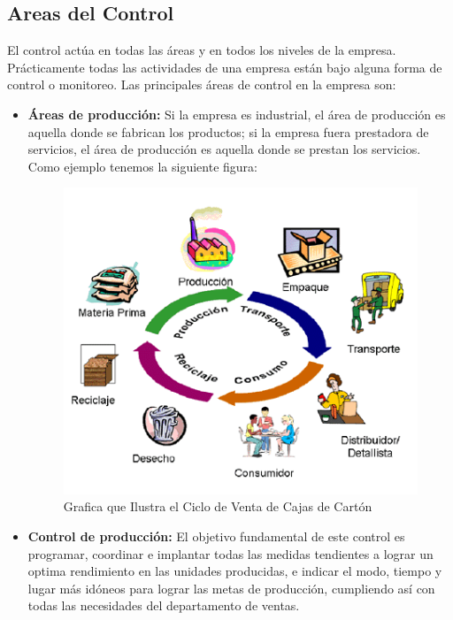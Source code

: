 \documentclass[12pt,letterpaper]{article}
\begin{document}
\subsection{Areas del Control}
El control actúa en todas las áreas y en todos los niveles de la empresa. Prácticamente todas las actividades de una empresa están bajo alguna forma de control o monitoreo. Las principales áreas de control en la empresa son:
\begin{itemize}
\item \textbf{Áreas de producción:} Si la empresa es industrial, el área de producción es aquella donde se fabrican los productos; si la empresa fuera prestadora de servicios, el área de producción es aquella donde se prestan los servicios. Como ejemplo tenemos la siguiente figura:
\begin{figure}[!h]
\centering
\includegraphics[scale=1.4]{CicloReciclaje}
\caption{Grafica que Ilustra el Ciclo de Venta de Cajas de Cartón}
\end{figure}
\item \textbf{Control de producción:} El objetivo fundamental de este control es programar, coordinar e implantar todas las medidas tendientes a lograr un optima rendimiento en las unidades producidas, e indicar el modo, tiempo y lugar más idóneos para lograr las metas de producción, cumpliendo así con todas las necesidades del departamento de ventas. 
\end{itemize}
\end{document}
